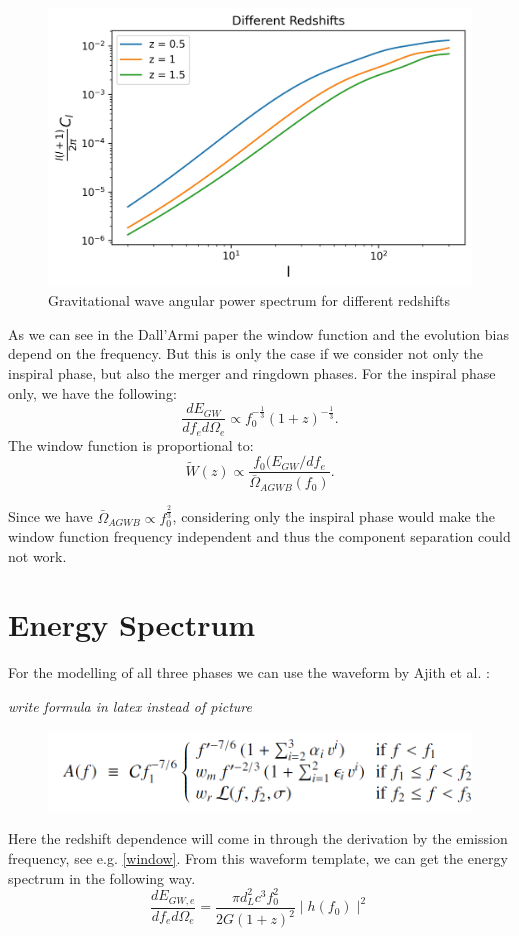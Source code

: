 \begin{figure}[h]
 \centering
 \includegraphics[width=0.7\linewidth]{Images/GW_autocorr_z.jpg}
 \caption{Gravitational wave angular power spectrum for different redshifts}
 \label{plot_Cl_redshift}
\end{figure} 

As we can see in the Dall'Armi paper the window function and the evolution bias 
depend on the frequency. But this is only the case if we consider not only the
 inspiral phase, but also the merger and ringdown phases. For the inspiral phase
  only, we have the following:
\begin{equation}
    \frac{dE_{GW}}{df_e d\Omega_e} \propto f_0^{-\frac{1}{3}}(1+z)^{-\frac{1}{3}} .
\end{equation}
The window function is proportional to:
\begin{equation}
    \tilde{W}(z)\propto \frac{f_0(E_{GW}/df_e}{\bar{\Omega}_{AGWB}(f_0)} .
\end{equation}

Since we have $\bar{\Omega}_{AGWB}\propto f_0^{\frac{2}{3}}$, considering only 
the inspiral phase would make the window function frequency independent and thus the 
component separation could not work. 


\section{Energy Spectrum}


For the modelling of all three phases we can 
use the waveform by Ajith et al. \cite{ajith_inspiral-merger-ringdown_2011}:

\textit{write formula in latex instead of picture}

\begin{figure}[h]
 \centering
\includegraphics[width=0.7\linewidth]{latex-formulas/ajith_IMR_waveform.PNG}
\label{IMR_waveform}
\end{figure} 
Here the redshift dependence will come in through the derivation by the emission 
frequency, see e.g. \ref{window}. From this waveform template, we can get the energy 
spectrum in the following way.
\begin{equation}
    \frac{dE_{GW,e}}{df_e d\Omega_e} = \frac{\pi d_L^2 c^3f_0^2}{2G(1+z)^2}
    \mid h(f_0)\mid ^2
\end{equation}

